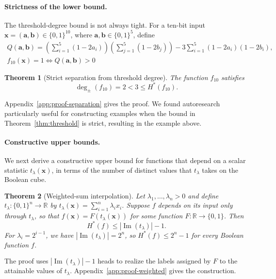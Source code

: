 \documentclass{article}
\newtheorem{theorem}{Theorem}
\theoremstyle{definition}
\theoremstyle{plain}
\newcommand{\hstar}{H^{\ast}}
\newcommand{\tdeg}{\deg_{\pm}}
\newcommand{\bits}{\{0,1\}}
\begin{document}
\paragraph{Strictness of the lower bound.}
The threshold-degree bound is not always tight. For a ten-bit input $\mathbf{x}=(\mathbf{a},\mathbf{b})\in\bits^{10}$, where $\mathbf{a},\mathbf{b}\in\bits^5$, define
\begin{equation}
\begin{gathered}
Q(\mathbf{a},\mathbf{b})=
\left(\sum_{i=1}^{5}(1-2a_i)\right)\left(\sum_{j=1}^{5}(1-2b_j)\right)
-3\sum_{i=1}^{5}\left(1-2a_i\right)\left(1-2b_i\right), \\
f_{10}(\mathbf{x})=1 \Longleftrightarrow Q(\mathbf{a},\mathbf{b})>0
\end{gathered}
\label{eq:f10}
\end{equation}
\begin{theorem}[Strict separation from threshold degree]
\label{thm:separation}
The function $f_{10}$ satisfies
\begin{equation*}
\tdeg(f_{10})=2<3\leq\hstar(f_{10}).
\end{equation*}
\end{theorem}
Appendix~\ref{app:proof-separation} gives the proof. We found autoresearch particularly useful for constructing examples when the bound in Theorem~\ref{thm:threshold} is strict, resulting in the example above.

\paragraph{Constructive upper bounds.}
We next derive a constructive upper bound for functions that depend on a scalar statistic $t_\lambda(\mathbf{x})$, in terms of the number of distinct values that $t_\lambda$ takes on the Boolean cube.

\begin{theorem}[Weighted-sum interpolation]
\label{thm:weighted-upper}
Let $\lambda_1,\ldots,\lambda_n>0$ and define $t_\lambda:\bits^n\to\mathbb{R}$ by $t_\lambda(\mathbf{x})=\sum_{i=1}^{n}\lambda_i x_i$. Suppose $f$ depends on its input only through $t_\lambda$, so that $f(\mathbf{x})=F(t_\lambda(\mathbf{x}))$ for some function $F:\mathbb{R}\to\bits$. Then
\begin{equation*}
\hstar(f)\leq |\operatorname{Im}(t_\lambda)|-1.
\end{equation*}
\textnormal{For $\lambda_i=2^{i-1}$, we have $|\operatorname{Im}(t_\lambda)|=2^n$, so $\hstar(f)\leq2^n-1$ for every Boolean function $f$.}
\end{theorem}
The proof uses $|\operatorname{Im}(t_\lambda)|-1$ heads to realize the labels assigned by $F$ to the attainable values of $t_\lambda$. Appendix~\ref{app:proof-weighted} gives the construction.
\end{document}
